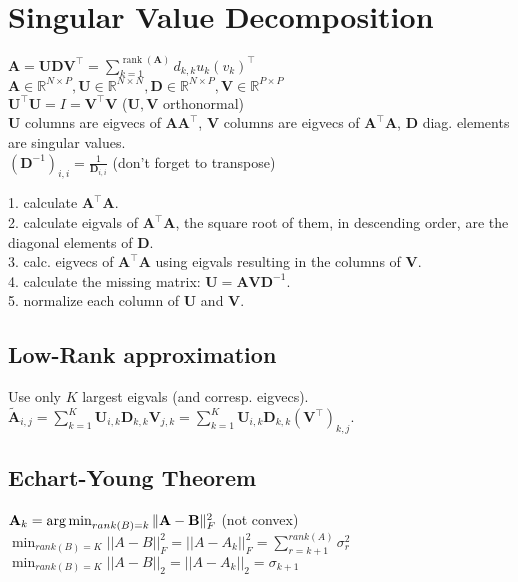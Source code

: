 \section{Singular Value Decomposition}
$\mathbf{A} = \mathbf{U} \mathbf{D} \mathbf{V}^\top = \sum_{k=1}^{\operatorname{rank}(\mathbf{A})} d_{k,k} u_k (v_k)^\top$\\
$\mathbf{A} \in \mathbb{R}^{N \times P}, \mathbf{U} \in \mathbb{R}^{N \times N}, \mathbf{D} \in \mathbb{R}^{N \times P}, \mathbf{V} \in \mathbb{R}^{P \times P}$\\
$\mathbf{U}^\top \mathbf{U} = I = \mathbf{V}^\top \mathbf{V}$ ($\mathbf{U}, \mathbf{V}$ orthonormal)\\
$\mathbf{U}$ columns are eigvecs of $\mathbf{A} \mathbf{A}^\top$, $\mathbf{V}$ columns are eigvecs of $\mathbf{A}^\top \mathbf{A}$, $\mathbf{D}$ diag. elements are singular values.\\
$(\mathbf{D}^{-1})_{i,i} = \frac{1}{\mathbf{D}_{i, i}}$ (don't forget to transpose)

1. calculate $\mathbf{A}^\top \mathbf{A}$.\\
2. calculate eigvals of $\mathbf{A}^\top \mathbf{A}$, the square root of them, in descending order, are the diagonal elements of $\mathbf{D}$.\\
3. calc. eigvecs of $\mathbf{A}^\top \mathbf{A}$ using eigvals resulting in the columns of $\mathbf{V}$.\\
4. calculate the missing matrix: $\mathbf{U} = \mathbf{A} \mathbf{V} \mathbf{D}^{-1}$.\\
5. normalize each column of $\mathbf{U}$ and $\mathbf{V}$.

\subsection*{Low-Rank approximation}
Use only $K$ largest eigvals (and corresp. eigvecs). $\tilde{\mathbf{A}}_{i, j} = \sum_{k=1}^K \mathbf{U}_{i, k} \mathbf{D}_{k,k} \mathbf{V}_{j, k} = \sum_{k=1}^K \mathbf{U}_{i, k} \mathbf{D}_{k,k} (\mathbf{V}^\top)_{k, j}$.

\subsection*{Echart-Young Theorem}
$\mathbf{A}_k=\operatorname*{arg\,min}_{rank(B)=k}\|\mathbf{A-B}\|_F^2$ (not convex)
$\min_{rank(B)=K} ||A-B||_F^2 = ||A-A_k||_F^2 = \sum_{r=k+1}^{rank(A)} \sigma_r^2$
$\min_{rank(B)=K} ||A-B||_2 = ||A-A_k||_2 = \sigma_{k+1}$
